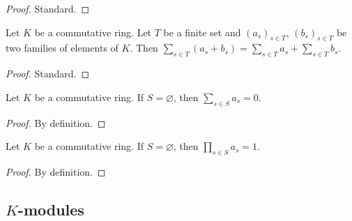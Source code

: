 \begin{proof}
\leanok
Standard.
\end{proof}

\begin{lemma}
\label{lem.commring.sum-add}
\leanhelper
\leanok
Let $K$ be a commutative ring. Let $T$ be a finite set and $(a_s)_{s\in T}$, $(b_s)_{s\in T}$
be two families of elements of $K$. Then
$\sum_{s\in T}\left(  a_{s}+b_{s}\right)  =\sum_{s\in T}a_{s}+\sum_{s\in T}b_{s}$.
\end{lemma}

\begin{proof}
\leanok
Standard.
\end{proof}

\begin{lemma}
\label{lem.commring.sum-empty}
\leanhelper
\leanok
Let $K$ be a commutative ring. If $S=\varnothing$, then $\sum_{s\in S}a_{s}=0$.
\end{lemma}

\begin{proof}
\leanok
By definition.
\end{proof}

\begin{lemma}
\label{lem.commring.prod-empty}
\leanhelper
\leanok
Let $K$ be a commutative ring. If $S=\varnothing$, then $\prod_{s\in S}a_{s}=1$.
\end{lemma}

\begin{proof}
\leanok
By definition.
\end{proof}

\subsection{$K$-modules}


